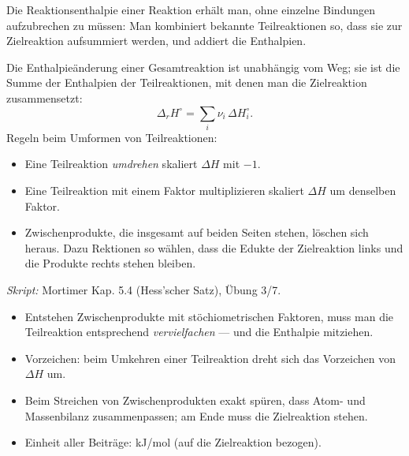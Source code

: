 

Die Reaktionsenthalpie einer Reaktion erhält man, ohne einzelne Bindungen
aufzubrechen zu müssen: Man kombiniert bekannte Teilreaktionen so, dass sie
zur Zielreaktion aufsummiert werden, und addiert die Enthalpien.

\begin{werkzeugkasten}
Die Enthalpieänderung einer Gesamtreaktion ist unabhängig vom Weg; sie ist die
Summe der Enthalpien der Teilreaktionen, mit denen man die Zielreaktion
zusammensetzt:
\begin{equation}
  \Delta_rH^\circ = \sum_i \nu_i\, \Delta H_i^\circ.
\end{equation}
Regeln beim Umformen von Teilreaktionen:
\begin{itemize}
  \item Eine Teilreaktion \emph{umdrehen} skaliert $\Delta H$ mit $-1$.
  \item Eine Teilreaktion mit einem Faktor multiplizieren skaliert $\Delta H$
        um denselben Faktor.
  \item Zwischenprodukte, die insgesamt auf beiden Seiten stehen, löschen sich
        heraus. Dazu Rektionen so wählen, dass die Edukte der Zielreaktion
        links und die Produkte rechts stehen bleiben.
\end{itemize}
\textit{Skript:} Mortimer Kap. 5.4 (Hess'scher Satz), Übung 3/7.
\end{werkzeugkasten}

\begin{achtung}
\begin{itemize}
  \item Entstehen Zwischenprodukte mit stöchiometrischen Faktoren, muss man
        die Teilreaktion entsprechend \emph{vervielfachen} --- und die
        Enthalpie mitziehen.
  \item Vorzeichen: beim Umkehren einer Teilreaktion dreht sich das Vorzeichen
        von $\Delta H$ um.
  \item Beim Streichen von Zwischenprodukten exakt spüren, dass Atom- und
        Massenbilanz zusammenpassen; am Ende muss die Zielreaktion stehen.
  \item Einheit aller Beiträge: kJ/mol (auf die Zielreaktion bezogen).
\end{itemize}
\end{achtung}
